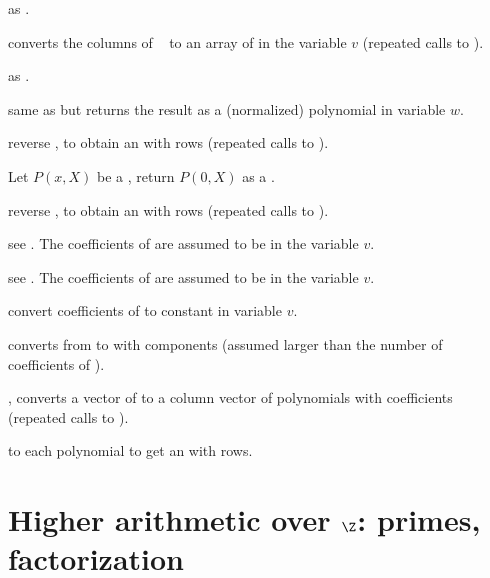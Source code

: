 as .

 converts the columns of
~ to an array of  in the variable $v$
(repeated calls to ).

 as .

 same as
 but returns the result as a (normalized) polynomial
in variable $w$.

 reverse , to obtain
an  with  rows (repeated calls to ).

 Let $P(x,X)$ be a , return $P(0,X)$
as a .

 reverse , to obtain
an  with  rows (repeated calls to ).

 see .
The coefficients of  are assumed to be in the variable $v$.

 see .
The coefficients of  are assumed to be in the variable $v$.

 convert coefficients of  to
constant  in variable $v$.


 converts from  to 
with  components (assumed larger than the number of coefficients of
).

, converts a vector of  to a column
vector of polynomials with  coefficients (repeated calls to
).



  to each polynomial
to get an  with  rows.

\section{Higher arithmetic over $\Z$: primes, factorization}

